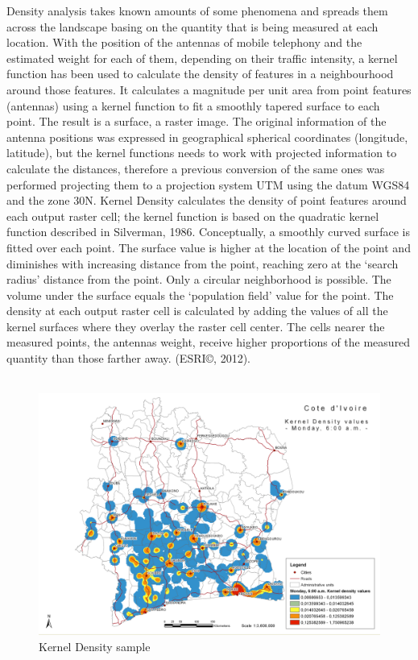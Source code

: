 \newpage
Density analysis takes known amounts of some phenomena and spreads them across the landscape basing on the quantity that is being measured at each location. With the position of the antennas of mobile telephony and the estimated weight for each of them, depending on their traffic intensity, a kernel function has been used to calculate the density of features in a neighbourhood around those features. It calculates a magnitude per unit area from point features (antennas) using a kernel function to fit a smoothly tapered surface to each point. The result is a surface, a raster image. The original information of the antenna positions was expressed in geographical spherical coordinates (longitude, latitude), but the kernel functions needs to work with  projected information to calculate the distances, therefore a previous conversion of the same ones was performed projecting them to a projection system UTM using the datum WGS84 and the zone 30N. Kernel Density calculates the density of point features around each output raster cell; the kernel function is based on the quadratic kernel function described in Silverman, 1986. Conceptually, a smoothly curved surface is fitted over each point. The surface value is higher at the location of the point and diminishes with increasing distance from the point, reaching zero at the ‘search radius’ distance from the point. Only a circular neighborhood is possible. The volume under the surface equals the ‘population field’ value for the point. The density at each output raster cell is calculated by adding the values of all the kernel surfaces where they overlay the raster cell center. The cells nearer the measured points, the antennas weight, receive higher proportions of the measured quantity than those farther away. (ESRI©, 2012).
\\
\\
\begin{figure}[h]
\begin{center}
\includegraphics[scale = 0.43] {results/images/kernel/L_hour6_kd_Map.pdf}
\caption{Kernel Density sample}
\label{fig:ks_sample}
\end{center}
\end{figure}


